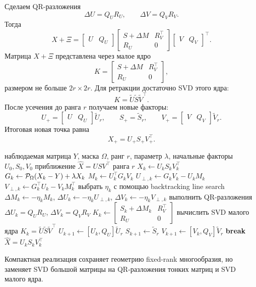 Сделаем QR-разложения
\[
\Delta U=Q_UR_U,\qquad \Delta V=Q_VR_V.
\]
Тогда
\[
X+\Xi
=
\begin{bmatrix}U & Q_U\end{bmatrix}
\begin{bmatrix}
S+\Delta M & R_V^\top\\
R_U & 0
\end{bmatrix}
\begin{bmatrix}V & Q_V\end{bmatrix}^\top.
\]
Матрица $X+\Xi$ представлена через малое ядро
\[
K=
\begin{bmatrix}
S+\Delta M & R_V^\top\\
R_U & 0
\end{bmatrix},
\]
размером не больше $2r\times 2r$. Для ретракции достаточно SVD этого ядра:
\[
K=\widetilde U\widetilde S\widetilde V^\top.
\]
После усечения до ранга $r$ получаем новые факторы:
\[
U_+=\begin{bmatrix}U & Q_U\end{bmatrix}\widetilde U_r,\qquad
S_+=\widetilde S_r,\qquad
V_+=\begin{bmatrix}V & Q_V\end{bmatrix}\widetilde V_r.
\]
Итоговая новая точка равна
\[
X_+=U_+S_+V_+^\top.
\]

\begin{algorithm}[H]
\caption{Компактный риманов градиентный спуск на $\Mcal_r$}
\label{alg:compact-rgd}
\begin{algorithmic}[1]
\Require наблюдаемая матрица $Y$, маска $\Omega$, ранг $r$, параметр $\lambda$, начальные факторы $U_0,S_0,V_0$
\Ensure приближение $\widehat X=USV^\top$ ранга $r$
    \State $X_k \gets U_kS_kV_k^\top$
    \State $G_k \gets \mathcal{P}_\Omega(X_k-Y)+\lambda X_k$
    \State $M_k \gets U_k^\top G_kV_k$
    \State $U_{\perp,k} \gets G_kV_k-U_kM_k$
    \State $V_{\perp,k} \gets G_k^\top U_k-V_kM_k^\top$
    \State выбрать $\eta_k$ с помощью backtracking line search
    \State $\Delta M_k\gets-\eta_kM_k$, $\Delta U_k\gets-\eta_kU_{\perp,k}$, $\Delta V_k\gets-\eta_kV_{\perp,k}$
    \State выполнить QR-разложения $\Delta U_k=Q_UR_U$, $\Delta V_k=Q_VR_V$
    \State $K_k\gets
    \begin{bmatrix}
    S_k+\Delta M_k & R_V^\top\\
    R_U & 0
    \end{bmatrix}$
    \State вычислить SVD малого ядра $K_k=\widetilde U\widetilde S\widetilde V^\top$
    \State $U_{k+1}\gets [U_k,Q_U]\widetilde U_r$
    \State $S_{k+1}\gets \widetilde S_r$
    \State $V_{k+1}\gets [V_k,Q_V]\widetilde V_r$
        \State \textbf{break}
    \EndIf
\EndFor
\State \Return $\widehat X=U_kS_kV_k^\top$
\end{algorithmic}
\end{algorithm}

Компактная реализация сохраняет геометрию fixed-rank многообразия, но заменяет SVD большой матрицы на QR-разложения тонких матриц и SVD малого ядра.
